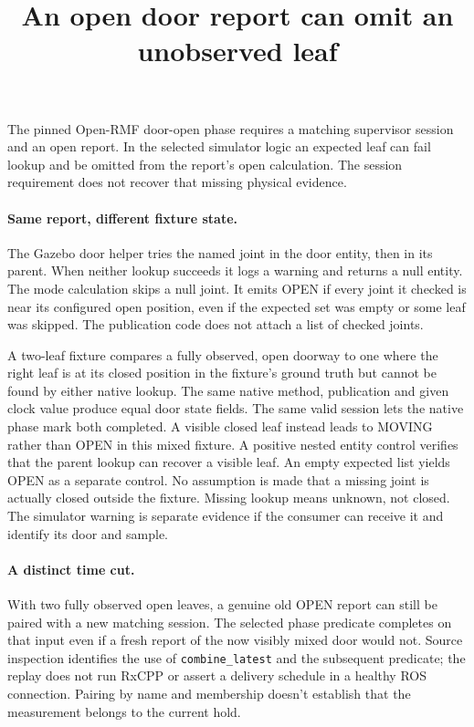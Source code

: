 \documentclass[11pt]{article}
\title{An open door report can omit an unobserved leaf}
\begin{document}
\maketitle

The pinned Open-RMF door-open phase requires a matching supervisor
session and an open report. In the selected simulator logic an
expected leaf can fail lookup and be omitted from the report's
open calculation. The session requirement does not recover that
missing physical evidence.

\paragraph{Same report, different fixture state.}
The Gazebo door helper tries the named joint in the door entity,
then in its parent. When neither lookup succeeds it logs a warning
and returns a null entity. The mode calculation skips a null joint.
It emits OPEN if every joint it checked is near its configured open
position, even if the expected set was empty or some leaf was skipped.
The publication code does not attach a list of checked joints.

A two-leaf fixture compares a fully observed, open doorway to one
where the right leaf is at its closed position in the fixture's
ground truth but cannot be found by either native lookup. The same
native method, publication and given clock value produce equal
door state fields. The same valid session lets the native phase
mark both completed. A visible closed leaf instead leads to MOVING
rather than OPEN in this mixed fixture. A positive nested entity
control verifies that the parent lookup can recover a visible leaf.
An empty expected list yields OPEN as a separate control.
No assumption is made that a missing joint is actually closed
outside the fixture. Missing lookup means unknown, not closed.
The simulator warning is separate evidence if the consumer can
receive it and identify its door and sample.

\paragraph{A distinct time cut.}
With two fully observed open leaves, a genuine old OPEN report
can still be paired with a new matching session. The selected
phase predicate completes on that input even if a fresh report of
the now visibly mixed door would not. Source inspection identifies
the use of \texttt{combine\_latest} and the subsequent predicate;
the replay does not run RxCPP or assert a delivery schedule in a
healthy ROS connection. Pairing by name and membership doesn't
establish that the measurement belongs to the current hold.
\end{document}
